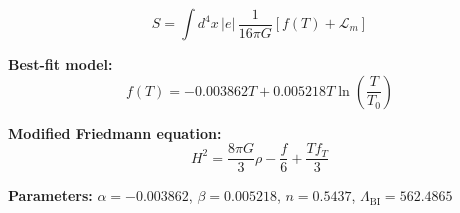
\begin{equation}
  S = \int d^4x \, |e| \, \frac{1}{16\pi G} \left[ f(T) + \mathcal{L}_m \right]
\end{equation}

\textbf{Best-fit model:}
\begin{equation}
  f(T) = -0.003862 T + 0.005218 T \ln\!\left(\frac{T}{T_0}\right)
\end{equation}

\textbf{Modified Friedmann equation:}
\begin{equation}
  H^2 = \frac{8\pi G}{3} \rho - \frac{f}{6} + \frac{T f_T}{3}
\end{equation}

\textbf{Parameters:}
$\alpha = -0.003862$, \quad
$\beta = 0.005218$, \quad
$n = 0.5437$, \quad
$\Lambda_{\text{BI}} = 562.4865$